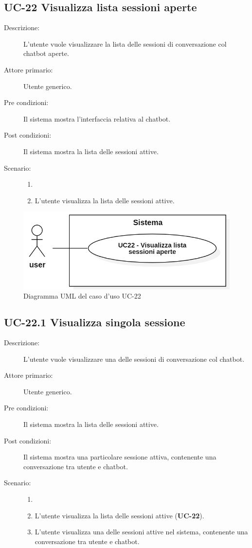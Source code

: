 \subsection{UC-22 Visualizza lista sessioni aperte}
\begin{description}
    \item[Descrizione:] L'utente vuole visualizzare la lista delle sessioni di conversazione col chatbot aperte.
    \item[Attore primario:] Utente generico.
    \item[Pre condizioni:] Il sistema mostra l'interfaccia relativa al chatbot.
    \item[Post condizioni:] Il sistema mostra la lista delle sessioni attive.
    \item[Scenario:]
    \begin{enumerate}
        \item[]
        \item L'utente visualizza la lista delle sessioni attive.
    \end{enumerate}
\end{description}

\begin{figure}[H]
    \centering
    \includegraphics[width=0.8\linewidth]{UC22.PNG}
    \caption{Diagramma UML del caso d'uso UC-22}
\end{figure}

\subsection{UC-22.1 Visualizza singola sessione}
\begin{description}
    \item[Descrizione:] L'utente vuole visualizzare una delle sessioni di conversazione col chatbot.
    \item[Attore primario:] Utente generico.
    \item[Pre condizioni:] Il sistema mostra la lista delle sessioni attive.
    \item[Post condizioni:] Il sistema mostra una particolare sessione attiva, contenente una conversazione tra utente e chatbot.
    \item[Scenario:] 
    \begin{enumerate}
        \item[]
        \item L'utente visualizza la lista delle sessioni attive (\textbf{UC-22}).
        \item L'utente visualizza una delle sessioni attive nel sistema, contenente una conversazione tra utente e chatbot.
    \end{enumerate}
\end{description}

